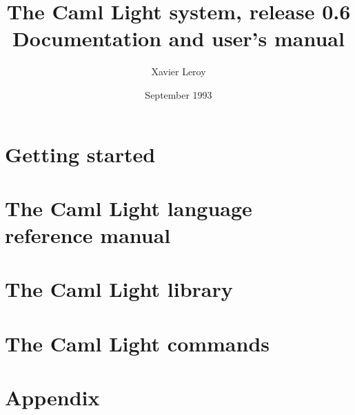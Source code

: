 \title{The Caml Light system, release 0.6 \\
       Documentation and user's manual}
\author{Xavier Leroy}
\date{September 1993}

\makeindex
{}

\emergencystretch=50pt  %



\maketitle

\tableofcontents



\part{Getting started}
\label{p:gettingstarted}


\part[The Caml Light language reference manual]
     {The Caml Light language \\ reference manual}
\label{p:refman}



\part{The Caml Light library}
\label{p:library}




\part{The Caml Light commands}
\label{p:commands}








\part{Appendix}
\label{p:appendix}





